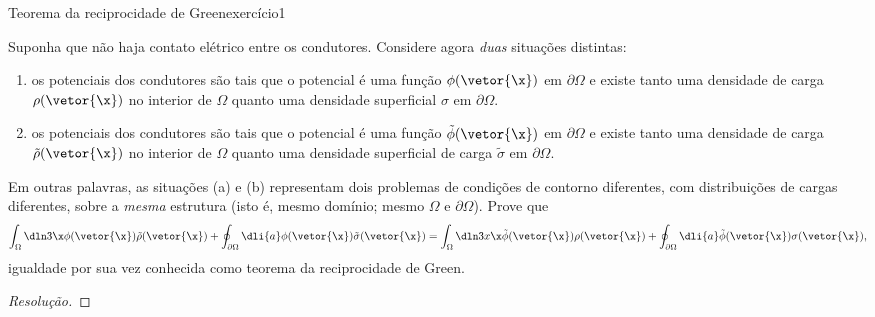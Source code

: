 \begin{exercício}{Teorema da reciprocidade de Green}{exercício1}
\begin{center}
    \end{center}
    Suponha que não haja contato elétrico entre os condutores. Considere agora \emph{duas} situações distintas:
    \begin{enumerate}[label=(\alph*)]
        \item os potenciais dos condutores são tais que o potencial é uma função \(\phi(\vetor{\x})\) em \(\partial \Omega\) e existe tanto uma densidade de carga \(\rho(\vetor{\x})\) no interior de \(\Omega\) quanto uma densidade superficial \(\sigma\) em \(\partial \Omega\).
        \item os potenciais dos condutores são tais que o potencial é uma função \(\tilde{\phi}(\vetor{\x})\) em \(\partial \Omega\) e existe tanto uma densidade de carga \(\tilde{\rho}(\vetor{\x})\) no interior de \(\Omega\) quanto uma densidade superficial de carga \(\tilde{\sigma}\) em \(\partial \Omega\).
    \end{enumerate}
    Em outras palavras, as situações (a) e (b) representam dois problemas de condições de contorno diferentes, com distribuições de cargas diferentes, sobre a \emph{mesma} estrutura (isto é, mesmo domínio; mesmo \(\Omega\) e \(\partial \Omega\)). Prove que
    \begin{equation*}
        \int_{\Omega}\dln3\x \phi(\vetor{\x}) \tilde{\rho}(\vetor{\x}) + \oint_{\partial \Omega}\dli{a} \phi(\vetor{\x})\tilde{\sigma}(\vetor{\x}) = \int_{\Omega}\dln3x\x \tilde{\phi}(\vetor{\x})\rho(\vetor{\x}) + \oint_{\partial \Omega} \dli{a} \tilde{\phi}(\vetor{\x})\sigma(\vetor{\x}),
    \end{equation*}
    igualdade por sua vez conhecida como teorema da reciprocidade de Green.
\end{exercício}
\begin{proof}[Resolução]

\end{proof}

